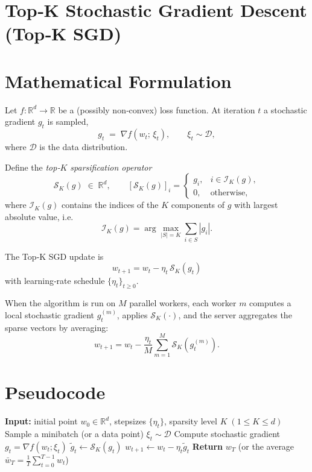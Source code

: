 \documentclass{article}
\newcommand{\topk}[1]{\mathcal{S}_K(#1)}
\begin{document}
\section*{Top‑K Stochastic Gradient Descent (Top‑K SGD)}

\section*{Mathematical Formulation}
Let $f:\mathbb{R}^d\rightarrow\mathbb{R}$ be a (possibly non‑convex) loss function.  
At iteration $t$ a stochastic gradient $g_t$ is sampled,
\[
g_t \;=\; \nabla f(w_t;\,\xi_t),\qquad \xi_t\sim\mathcal{D},
\]
where $\mathcal{D}$ is the data distribution.  

Define the \emph{top‑$K$ sparsification operator}
\[
\topk{g}\;\in\;\mathbb{R}^d,\qquad
[\topk{g}]_i=\begin{cases}
g_i, & i\in\mathcal{I}_K(g),\\[2mm]
0,   & \text{otherwise},
\end{cases}
\]
where $\mathcal{I}_K(g)$ contains the indices of the $K$ components of $g$ with largest absolute value, i.e.
\[
\mathcal{I}_K(g)=\arg\!\max_{|S|=K}\sum_{i\in S}|g_i|.
\]

The Top‑K SGD update is
\begin{equation}
\boxed{\,w_{t+1}=w_t-\eta_t\,\topk{g_t}\,} \tag{1}
\end{equation}
with learning‑rate schedule $\{\eta_t\}_{t\ge0}$.

When the algorithm is run on $M$ parallel workers, each worker $m$ computes a local stochastic gradient $g_t^{(m)}$, applies $\topk{\cdot}$, and the server aggregates the sparse vectors by averaging:
\[
w_{t+1}=w_t-\frac{\eta_t}{M}\sum_{m=1}^{M}\topk{g_t^{(m)}} .
\]

\section*{Pseudocode}
\begin{algorithm}[H]
\caption{Top‑K SGD}
\begin{algorithmic}[1]
\State \textbf{Input:} initial point $w_0\in\mathbb{R}^d$, stepsizes $\{\eta_t\}$, sparsity level $K\;(1\le K\le d)$
    \State Sample a minibatch (or a data point) $\xi_t\sim\mathcal D$
    \State Compute stochastic gradient $g_t=\nabla f(w_t;\xi_t)$
    \State $\displaystyle \tilde g_t\gets \topk{g_t}$ 
    \State $w_{t+1}\gets w_t-\eta_t\tilde g_t$
\EndFor
\State \textbf{Return} $w_T$ (or the average $\bar w_T=\frac1T\sum_{t=0}^{T-1}w_t$)
\end{algorithmic}
\end{algorithm}
\end{document}
